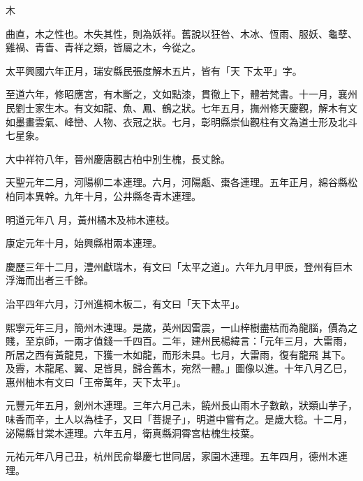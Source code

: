 
\begin{pinyinscope}

 木



 曲直，木之性也。木失其性，則為妖祥。舊說以狂咎、木冰、恆雨、服妖、龜孽、雞禍、青眚、青祥之類，皆屬之木，今從之。



 太平興國六年正月，瑞安縣民張度解木五片，皆有「天
 下太平」字。



 至道六年，修昭應宮，有木斷之，文如點漆，貫徹上下，體若梵書。十一月，襄州民劉士家生木。有文如龍、魚、鳳、鶴之狀。七年五月，撫州修天慶觀，解木有文如墨畫雲氣、峰巒、人物、衣冠之狀。七月，彰明縣崇仙觀柱有文為道士形及北斗七星象。



 大中祥符八年，晉州慶唐觀古柏中別生槐，長丈餘。



 天聖元年二月，河陽柳二本連理。六月，河陽甗、棗各連理。五年正月，綿谷縣松柏同本異幹。九年十月，公井縣冬青木連理。



 明道元年八
 月，黃州橘木及柿木連枝。



 康定元年十月，始興縣柑兩本連理。



 慶歷三年十二月，澧州獻瑞木，有文曰「太平之道」。六年九月甲辰，登州有巨木浮海而出者三千餘。



 治平四年六月，汀州進桐木板二，有文曰「天下太平」。



 熙寧元年三月，簡州木連理。是歲，英州因雷震，一山梓樹盡枯而為龍腦，價為之賤，至京師，一兩才值錢一千四百。二年，建州民楊緯言：「元年三月，大雷雨，所居之西有黃龍見，下獲一木如龍，而形未具。七月，大雷雨，復有龍飛
 其下。及霽，木龍尾、翼、足皆具，歸合舊木，宛然一體。」圖像以進。十年八月乙巳，惠州柚木有文曰「王帝萬年，天下太平」。



 元豐元年五月，劍州木連理。三年六月己未，饒州長山雨木子數畝，狀類山芋子，味香而辛，土人以為桂子，又曰「菩提子」，明道中嘗有之。是歲大稔。十二月，泌陽縣甘棠木連理。六年五月，衛真縣洞霄宮枯槐生枝葉。



 元祐元年八月己丑，杭州民俞舉慶七世同居，家園木連理。五年四月，德州木連理。




\end{pinyinscope}

